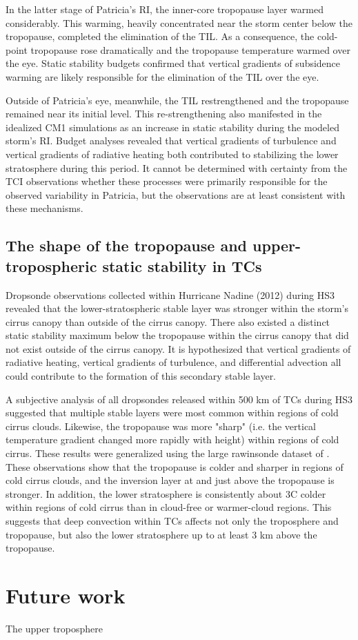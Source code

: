 In the latter stage of Patricia's RI, the inner-core tropopause layer warmed considerably.
This warming, heavily concentrated near the storm center below the tropopause, completed the elimination of the TIL.
As a consequence, the cold-point tropopause rose dramatically and the tropopause temperature warmed over the eye.
Static stability budgets confirmed that vertical gradients of subsidence warming are likely responsible for the elimination of the TIL over the eye.

Outside of Patricia's eye, meanwhile, the TIL restrengthened and the tropopause remained near its initial level.
This re-strengthening also manifested in the idealized CM1 simulations as an increase in static stability during the modeled storm's RI.
Budget analyses revealed that vertical gradients of turbulence and vertical gradients of radiative heating both contributed to stabilizing the lower stratosphere during this period.
It cannot be determined with certainty from the TCI observations whether these processes were primarily responsible for the observed variability in Patricia, but the observations are at least consistent with these mechanisms.

\subsection{The shape of the tropopause and upper-tropospheric static stability in TCs}

Dropsonde observations collected within Hurricane Nadine (2012) during HS3 revealed that the lower-stratospheric stable layer was stronger within the storm's cirrus canopy than outside of the cirrus canopy.
There also existed a distinct static stability maximum below the tropopause within the cirrus canopy that did not exist outside of the cirrus canopy.
It is hypothesized that vertical gradients of radiative heating, vertical gradients of turbulence, and differential advection all could contribute to the formation of this secondary stable layer.

A subjective analysis of all dropsondes released within 500 km of TCs during HS3 suggested that multiple stable layers were most common within regions of cold cirrus clouds.
Likewise, the tropopause was more "sharp" (i.e. the vertical temperature gradient changed more rapidly with height) within regions of cold cirrus.
These results were generalized using the large rawinsonde dataset of \cite{DuranMolinari2016}.
These observations show that the tropopause is colder and sharper in regions of cold cirrus clouds, and the inversion layer at and just above the tropopause is stronger.
In addition, the lower stratosphere is consistently about 3\textdegree{}C colder within regions of cold cirrus than in cloud-free or warmer-cloud regions.
This suggests that deep convection within TCs affects not only the troposphere and tropopause, but also the lower stratosphere up to at least 3 km above the tropopause.

\section{Future work}

The upper troposphere   
